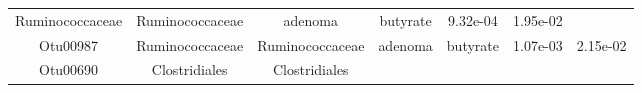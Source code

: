 \documentclass[11pt,]{article}
\begin{document}
\begin{longtable}[]{@{}ccccccc@{}}
\begin{minipage}[t]{0.17\columnwidth}
Ruminococcaceae\strut
\end{minipage} & \begin{minipage}[t]{0.17\columnwidth}\centering\strut
Ruminococcaceae\strut
\end{minipage} & \begin{minipage}[t]{0.09\columnwidth}\centering\strut
adenoma\strut
\end{minipage} & \begin{minipage}[t]{0.11\columnwidth}\centering\strut
butyrate\strut
\end{minipage} & \begin{minipage}[t]{0.09\columnwidth}\centering\strut
9.32e-04\strut
\end{minipage} & \begin{minipage}[t]{0.09\columnwidth}\centering\strut
1.95e-02\strut
\end{minipage}\tabularnewline
\begin{minipage}[t]{0.09\columnwidth}\centering\strut
Otu00987\strut
\end{minipage} & \begin{minipage}[t]{0.17\columnwidth}\centering\strut
Ruminococcaceae\strut
\end{minipage} & \begin{minipage}[t]{0.17\columnwidth}\centering\strut
Ruminococcaceae\strut
\end{minipage} & \begin{minipage}[t]{0.09\columnwidth}\centering\strut
adenoma\strut
\end{minipage} & \begin{minipage}[t]{0.11\columnwidth}\centering\strut
butyrate\strut
\end{minipage} & \begin{minipage}[t]{0.09\columnwidth}\centering\strut
1.07e-03\strut
\end{minipage} & \begin{minipage}[t]{0.09\columnwidth}\centering\strut
2.15e-02\strut
\end{minipage}\tabularnewline
\begin{minipage}[t]{0.09\columnwidth}\centering\strut
Otu00690\strut
\end{minipage} & \begin{minipage}[t]{0.17\columnwidth}\centering\strut
Clostridiales\strut
\end{minipage} & \begin{minipage}[t]{0.17\columnwidth}\centering\strut
Clostridiales\strut
\end{minipage} & \begin{minipage}[t]{0.09\columnwidth}\centering\strut

\end{minipage}
\end{longtable}
\end{document}
